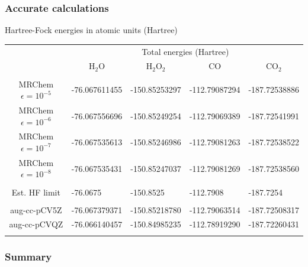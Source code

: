 \documentclass[mathserif, 10pt]{beamer}
\begin{document}
\begin{frame}
    \frametitle{Accurate calculations}
    \centering
    Hartree-Fock energies in atomic units (Hartree)
\begin{table}
\tiny
\begin{tabular}{cllll}
\hline   
\hline
&\multicolumn{4}{c}{Total energies (Hartree)}\\
&\multicolumn{1}{c}{H$_2$O}
&\multicolumn{1}{c}{H$_2$O$_2$}
&\multicolumn{1}{c}{CO}
&\multicolumn{1}{c}{CO$_2$}\\
\hline 
            		    &               &               &               &               \\
MRChem $\epsilon=10^{-5}$   & -76.067611455 & -150.85253297 & -112.79087294 & -187.72538886 \\
MRChem $\epsilon=10^{-6}$   & -76.067556696 & -150.85249254 & -112.79069389 & -187.72541991 \\
MRChem $\epsilon=10^{-7}$   & -76.067535613 & -150.85246986 & -112.79081263 & -187.72538522 \\
MRChem $\epsilon=10^{-8}$   & -76.067535431 & -150.85247037 & -112.79081269 & -187.72538560 \\
            		    &               &               &               &               \\
Est. HF limit		    & -76.0675      & -150.8525     & -112.7908     & -187.7254     \\
            		    &               &               &               &               \\
aug-cc-pCV5Z		    & -76.067379371 & -150.85218780 & -112.79063514 & -187.72508317 \\
aug-cc-pCVQZ		    & -76.066140457 & -150.84985235 & -112.78919290 & -187.72260431 \\
            		    &               &               &               &               \\
\hline   
\hline   
\end{tabular}
\end{table}
\end{frame}

\begin{frame}
    \frametitle{Summary}
\end{frame}
\end{document}
